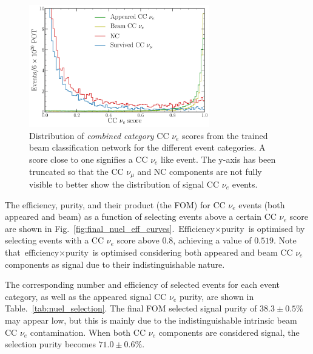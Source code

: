 \begin{figure} %
    \includegraphics[width=0.7\textwidth]{diagrams/7-results/final_beam_nuel_outputs.pdf}
    \caption[Distribution of CC $\nu_{e}$ scores from the trained beam classification network]
    {Distribution of \emph{combined category} CC $\nu_{e}$ scores from the trained beam
        classification network for the different event categories. A score close to one signifies
        a CC $\nu_{e}$ like event. The y-axis has been truncated so that the CC $\nu_{\mu}$ and NC
        components are not fully visible to better show the distribution of signal CC $\nu_{e}$
        events.}
    \label{fig:final_beam_nuel_outputs}
\end{figure}

The efficiency, purity, and their product (the FOM) for CC $\nu_{e}$ events (both appeared and
beam) as a function of selecting events above a certain CC $\nu_{e}$ score are shown in
Fig.~\ref{fig:final_nuel_eff_curves}. $\text{Efficiency}\times\text{purity}$ is optimised by
selecting events with a CC $\nu_{e}$ score above $0.8$, achieving a value of $0.519$. Note that
$\text{efficiency}\times\text{purity}$ is optimised considering both appeared and beam CC
$\nu_{e}$ components as signal due to their indistinguishable nature.

The corresponding number and efficiency of selected events for each event category, as well as the
appeared signal CC $\nu_{e}$ purity, are shown in Table.~\ref{tab:nuel_selection}. The final FOM
selected signal purity of $38.3\pm0.5\%$ may appear low, but this is mainly due to the
indistinguishable intrinsic beam CC $\nu_{e}$ contamination. When both CC $\nu_{e}$ components are
considered signal, the selection purity becomes $71.0\pm0.6\%$.

